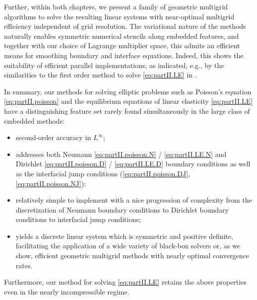 Further, within both chapters, we present a family of geometric multigrid algorithms to solve the resulting linear systems with near-optimal multigrid efficiency independent of grid resolution. The variational nature of the methods naturally enables symmetric numerical stencils along embedded features, and together with our choice of Lagrange multiplier space, this admits an efficient means for smoothing boundary and interface equations. Indeed, this shows the suitability of efficient parallel implementations, as indicated, e.g., by the similarities to the first order method to solve \eqref{eq:partII.LE} in \cite{Zhu.Yongning10}.

In summary, our methods for solving elliptic problems such as Poisson's equation \eqref{eq:partII.poisson} and the equilibrium equations of linear elasticity \eqref{eq:partII.LE} have a distinguishing feature set rarely found simultaneously in the large class of embedded methods:
\begin{itemize}
\item second-order accuracy in $L^{\infty}$;
\item addresses both Neumann \eqref{eq:partII.poisson.N} / \eqref{eq:partII.LE.N} and Dirichlet \eqref{eq:partII.poisson.D} / \eqref{eq:partII.LE.D} boundary conditions as well as the interfacial jump conditions (\ref{eq:partII.poisson.DJ}, \ref{eq:partII.poisson.NJ});
\item relatively simple to implement with a nice progression of complexity from the discretization of Neumann boundary conditions to Dirichlet boundary conditions to interfacial jump conditions;
\item yields a discrete linear system which is symmetric and positive definite, facilitating the application of a wide variety of black-box solvers or, as we show, efficient geometric multigrid methods with nearly optimal convergence rates.
\end{itemize}
Furthermore, our method for solving \eqref{eq:partII.LE} retains the above properties even in the nearly incompressible regime.

\renewcommand{\thechapter}{\arabic{chapter}}
